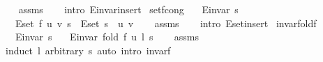 \begin{isabellebody}
%
\isadeliminvisible
%
\endisadeliminvisible
\isanewline
%
\isadelimproof
\ \ %
\endisadelimproof
%
\isatagproof
{}\isamarkupfalse%
\ assms\isanewline
\ \ \isamarkupfalse%
\ {\isacharparenleft}{\kern0pt}intro\ E{\isachardot}{\kern0pt}invar{\isacharunderscore}{\kern0pt}insert{\isacharparenright}{\kern0pt}%
\endisatagproof
{\isafoldproof}%
%
\isadelimproof
%
\endisadelimproof
\isanewline
%
\isadeliminvisible
\isanewline
%
\endisadeliminvisible
%
\isataginvisible
{}\isamarkupfalse%
\ set{\isacharunderscore}{\kern0pt}f{\isacharunderscore}{\kern0pt}cong{\isacharcolon}{\kern0pt}\isanewline
\ \ \ {\isachardoublequoteopen}E{\isachardot}{\kern0pt}invar\ s{\isachardoublequoteclose}\isanewline
\ \ \ {\isachardoublequoteopen}E{\isachardot}{\kern0pt}set\ {\isacharparenleft}{\kern0pt}f\ u\ v\ s{\isacharparenright}{\kern0pt}\ {\isacharequal}{\kern0pt}\ E{\isachardot}{\kern0pt}set\ s\ {\isasymunion}\ {\isacharbraceleft}{\kern0pt}{\isacharparenleft}{\kern0pt}u{\isacharcomma}{\kern0pt}\ v{\isacharparenright}{\kern0pt}{\isacharbraceright}{\kern0pt}{\isachardoublequoteclose}%
\endisataginvisible
{\isafoldinvisible}%
%
\isadeliminvisible
%
\endisadeliminvisible
\isanewline
%
\isadelimproof
\ \ %
\endisadelimproof
%
\isatagproof
{}\isamarkupfalse%
\ assms\isanewline
\ \ \isamarkupfalse%
\ {\isacharparenleft}{\kern0pt}intro\ E{\isachardot}{\kern0pt}set{\isacharunderscore}{\kern0pt}insert{\isacharparenright}{\kern0pt}%
\endisatagproof
{\isafoldproof}%
%
\isadelimproof
%
\endisadelimproof
\isanewline
%
\isadeliminvisible
\isanewline
%
\endisadeliminvisible
%
\isataginvisible
{}\isamarkupfalse%
\ invar{\isacharunderscore}{\kern0pt}fold{\isacharunderscore}{\kern0pt}f{\isacharcolon}{\kern0pt}\isanewline
\ \ \ {\isachardoublequoteopen}E{\isachardot}{\kern0pt}invar\ s{\isachardoublequoteclose}\isanewline
\ \ \ {\isachardoublequoteopen}E{\isachardot}{\kern0pt}invar\ {\isacharparenleft}{\kern0pt}fold\ {\isacharparenleft}{\kern0pt}f\ u{\isacharparenright}{\kern0pt}\ l\ s{\isacharparenright}{\kern0pt}{\isachardoublequoteclose}%
\endisataginvisible
{\isafoldinvisible}%
%
\isadeliminvisible
%
\endisadeliminvisible
\isanewline
%
\isadelimproof
\ \ %
\endisadelimproof
%
\isatagproof
{}\isamarkupfalse%
\ assms\isanewline
\ \ \isamarkupfalse%
\ {\isacharparenleft}{\kern0pt}induct\ l\ arbitrary{\isacharcolon}{\kern0pt}\ s{\isacharparenright}{\kern0pt}\ {\isacharparenleft}{\kern0pt}auto\ intro{\isacharcolon}{\kern0pt}\ invar{\isacharunderscore}{\kern0pt}f{\isacharparenright}{\kern0pt}%

\end{isabellebody}
